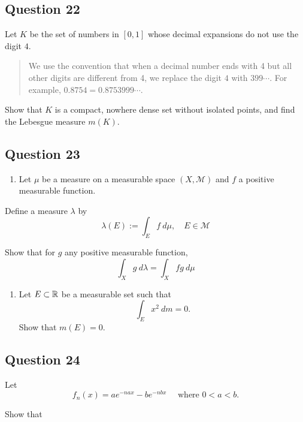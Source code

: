 \documentclass[12pt]{article}
\providecommand{\tightlist}{%
  \setlength{\itemsep}{0pt}\setlength{\parskip}{0pt}}
\begin{document}
\hypertarget{question-22-1}{%
\subsection{Question 22}\label{question-22-1}}

Let \(K\) be the set of numbers in \([0, 1]\) whose decimal expansions
do not use the digit \(4\).

\begin{quote}
We use the convention that when a decimal number ends with 4 but all
other digits are different from 4, we replace the digit \(4\) with
\(399\cdots\). For example, \(0.8754 = 0.8753999\cdots\).
\end{quote}

Show that \(K\) is a compact, nowhere dense set without isolated points,
and find the Lebesgue measure \(m(K)\).

\hypertarget{question-23-1}{%
\subsection{Question 23}\label{question-23-1}}

\begin{enumerate}
\def\labelenumi{\alph{enumi}.}
\tightlist
\item
  Let \(\mu\) be a measure on a measurable space \((X, \mathcal M)\) and
  \(f\) a positive measurable function.
\end{enumerate}

Define a measure \(\lambda\) by \[
\lambda(E):=\int_{E} f ~d \mu, \quad E \in \mathcal{M}
\]

Show that for \(g\) any positive measurable function, \[
\int_{X} g ~d \lambda=\int_{X} f g ~d \mu
\]

\begin{enumerate}
\def\labelenumi{\alph{enumi}.}
\setcounter{enumi}{1}
\tightlist
\item
  Let \(E \subset {\mathbb{R}}\) be a measurable set such that \[
  \int_{E} x^{2} ~d m=0.
  \] Show that \(m(E) = 0\).
\end{enumerate}

\hypertarget{question-24-1}{%
\subsection{Question 24}\label{question-24-1}}

Let \[
f_{n}(x)=a e^{-n a x}-b e^{-n b x} \quad \text{ where } 0 < a < b.
\]

Show that
\end{document}
